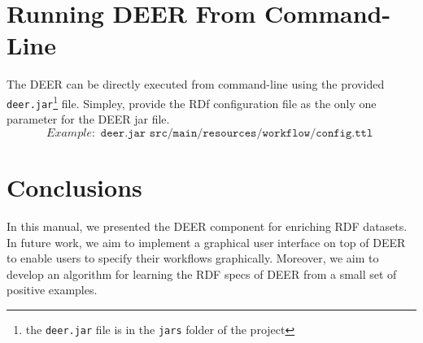\documentclass[a4paper,twoside,bibtotoc,abstracton,12pt,BCOR=15mm]{article}
\newcommand{\geolift}{\textsc{DEER}\xspace}
\begin{document}
\section{Running \geolift From Command-Line }

The \geolift can be directly executed from command-line using the provided \texttt{deer.jar}\footnote{the \texttt{deer.jar} file is in the \texttt{jars} folder of the project} file.
Simpley, provide the RDf configuration file as the only one parameter for the \geolift jar file.
\begin{equation*}
  Example: \texttt{ deer.jar src/main/resources/workflow/config.ttl }
\end{equation*}

\section{Conclusions}
In this manual, we presented the \geolift component for enriching RDF datasets.
In future work, we aim to implement a graphical user interface on top of \geolift to enable users to specify their workflows graphically.
Moreover, we aim to develop an algorithm for learning the RDF specs of \geolift from a small set of positive examples.



\end{document}
